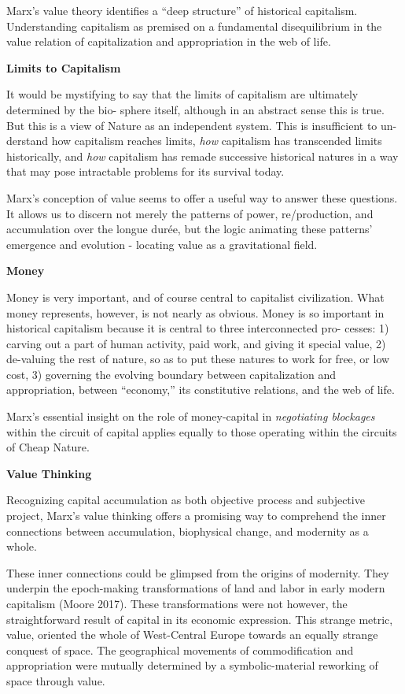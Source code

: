 \documentclass[
]{book}
\begin{document}
Marx's value theory identifies a ``deep structure'' of historical capitalism.
Understanding capitalism as premised on a fundamental
disequilibrium in the value relation of capitalization and appropriation
in the web of life.

\textbf{Limits to Capitalism}

It would be mystifying to say
that the limits of capitalism are ultimately determined by the bio-
sphere itself, although in an abstract sense this is true. But this is a
view of Nature as an independent system. This is insufficient to un-
derstand how capitalism reaches limits, \emph{how} capitalism has transcended
limits historically, and \emph{how} capitalism has remade successive
historical natures in a way that may pose intractable problems for its
survival today.

Marx's conception of value seems to offer a useful way to answer
these questions. It allows us to discern not merely the patterns of
power, re/production, and accumulation over the longue durée, but
the logic animating these patterns' emergence and evolution
- locating value as a gravitational field.

\textbf{Money}

Money is very important, and of course central to capitalist civilization. What money
represents, however, is not nearly as obvious. Money is so important in
historical capitalism because it is central to three interconnected pro-
cesses: 1) carving out a part of human activity, paid work, and giving
it special value, 2) de-valuing the rest of nature, so as to put these
natures to work for free, or low cost, 3) governing the evolving
boundary between capitalization and appropriation, between ``economy,''
its constitutive relations, and the web of life.

Marx's essential insight on
the role of money-capital in \emph{negotiating blockages} within the circuit
of capital applies equally to those operating within the circuits of
Cheap Nature.

\textbf{Value Thinking}

Recognizing capital accumulation as both objective process and
subjective project, Marx's value thinking offers a promising way to
comprehend the inner connections between accumulation, biophysical
change, and modernity as a whole.

These inner connections
could be glimpsed from the origins of modernity. They underpin the
epoch-making transformations of land and labor in early modern
capitalism (Moore 2017). These transformations were not however,
the straightforward result of capital in its economic expression. This
strange metric, value, oriented the whole of West-Central Europe
towards an equally strange conquest of space. The geographical
movements of commodification and appropriation were mutually
determined by a symbolic-material reworking of space through value.
\end{document}
